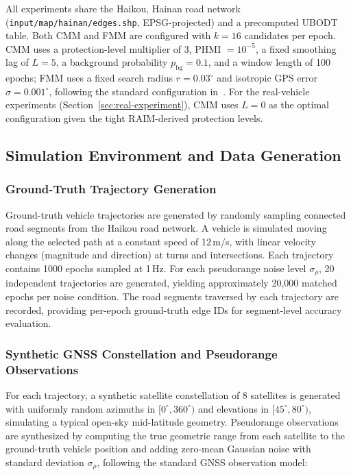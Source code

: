 \documentclass[letterpaper,journal]{IEEEtran}
\begin{document}
All experiments share the Haikou, Hainan road network (\texttt{input/map/hainan/edges.shp}, EPSG-projected) and a precomputed UBODT table. Both CMM and FMM are configured with $k=16$ candidates per epoch. CMM uses a protection-level multiplier of 3, PHMI $=10^{-5}$, a fixed smoothing lag of $L=5$, a background probability $p_{\text{bg}}=0.1$, and a window length of 100 epochs; FMM uses a fixed search radius $r=0.03^\circ$ and isotropic GPS error $\sigma=0.001^\circ$, following the standard configuration in~\cite{FMM}. For the real-vehicle experiments (Section~\ref{sec:real-experiment}), CMM uses $L=0$ as the optimal configuration given the tight RAIM-derived protection levels.

\subsection{Simulation Environment and Data Generation}
\label{sec:sim_environment}

\subsubsection{Ground-Truth Trajectory Generation}

Ground-truth vehicle trajectories are generated by randomly sampling connected road segments from the Haikou road network. A vehicle is simulated moving along the selected path at a constant speed of 12\,m/s, with linear velocity changes (magnitude and direction) at turns and intersections. Each trajectory contains 1000 epochs sampled at 1\,Hz. For each pseudorange noise level $\sigma_{\rho}$, 20 independent trajectories are generated, yielding approximately 20,000 matched epochs per noise condition. The road segments traversed by each trajectory are recorded, providing per-epoch ground-truth edge IDs for segment-level accuracy evaluation.

\subsubsection{Synthetic GNSS Constellation and Pseudorange Observations}

For each trajectory, a synthetic satellite constellation of 8 satellites is generated with uniformly random azimuths in $[0^\circ,360^\circ)$ and elevations in $[45^\circ,80^\circ)$, simulating a typical open-sky mid-latitude geometry. Pseudorange observations are synthesized by computing the true geometric range from each satellite to the ground-truth vehicle position and adding zero-mean Gaussian noise with standard deviation $\sigma_{\rho}$, following the standard GNSS observation model:
\end{document}
